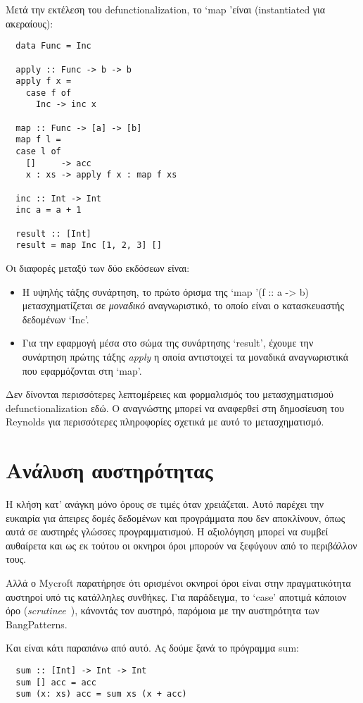 \documentclass[diploma]{softlab-thesis}
\begin{document}
Μετά την εκτέλεση του defunctionalization, το `map 'είναι (instantiated για ακεραίους):
\begin{verbatim}
  data Func = Inc 

  apply :: Func -> b -> b
  apply f x =
    case f of
      Inc -> inc x

  map :: Func -> [a] -> [b]
  map f l =
  case l of
    []     -> acc
    x : xs -> apply f x : map f xs

  inc :: Int -> Int 
  inc a = a + 1

  result :: [Int]
  result = map Inc [1, 2, 3] []
\end{verbatim}

Οι διαφορές μεταξύ των δύο εκδόσεων είναι:
\begin{itemize}
\item Η υψηλής τάξης συνάρτηση, το πρώτο όρισμα της `map '(f :: a -> b)
μετασχηματίζεται σε \textit{μοναδικό} αναγνωριστικό, το οποίο είναι ο κατασκευαστής δεδομένων `Inc'.
\item Για την εφαρμογή μέσα στο σώμα της συνάρτησης `result', έχουμε την συνάρτηση πρώτης τάξης 
\textit{apply} η οποία αντιστοιχεί τα μοναδικά αναγνωριστικά που εφαρμόζονται στη `map'.
\end{itemize}

Δεν δίνονται περισσότερες λεπτομέρειες και φορμαλισμός του μετασχηματισμού defunctionalization εδώ.
Ο αναγνώστης μπορεί να αναφερθεί στη δημοσίευση του Reynolds για περισσότερες πληροφορίες 
σχετικά με αυτό το μετασχηματισμό.

\section{Ανάλυση αυστηρότητας}

Η κλήση κατ' ανάγκη μόνο όρους σε τιμές όταν χρειάζεται. Αυτό παρέχει την
ευκαιρία για άπειρες δομές δεδομένων και προγράμματα που δεν αποκλίνουν, όπως αυτά σε
αυστηρές γλώσσες προγραμματισμού. H αξιολόγηση μπορεί να συμβεί
αυθαίρετα και ως εκ τούτου οι οκνηροι όροι μπορούν να ξεφύγουν από το περιβάλλον τους.

Αλλά ο Mycroft παρατήρησε ότι ορισμένοι οκνηροί όροι είναι στην
πραγματικότητα αυστηροί υπό τις κατάλληλες συνθήκες. Για παράδειγμα,
το `case' αποτιμά κάποιον όρο (\emph{scrutinee}~\cite{PeytonJones94}),
κάνοντάς τον αυστηρό, παρόμοια με την αυστηρότητα των BangPatterns.

Και είναι κάτι παραπάνω από αυτό. Ας δούμε ξανά το πρόγραμμα sum:
\begin{verbatim}
  sum :: [Int] -> Int -> Int
  sum [] acc = acc
  sum (x: xs) acc = sum xs (x + acc)
\end{verbatim}
\end{document}
